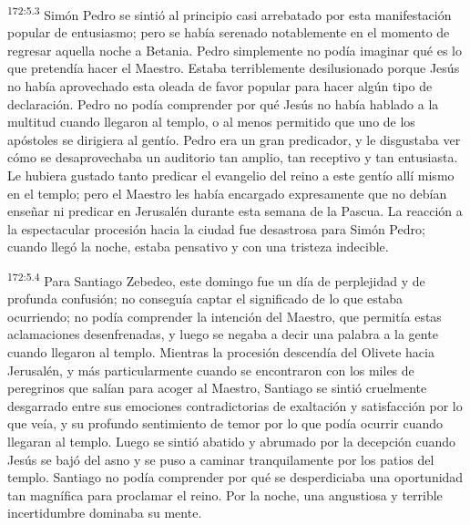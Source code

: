 \par 
\textsuperscript{172:5.3} Simón Pedro se sintió al principio casi arrebatado por esta manifestación popular de entusiasmo; pero se había serenado notablemente en el momento de regresar aquella noche a Betania. Pedro simplemente no podía imaginar qué es lo que pretendía hacer el Maestro. Estaba terriblemente desilusionado porque Jesús no había aprovechado esta oleada de favor popular para hacer algún tipo de declaración. Pedro no podía comprender por qué Jesús no había hablado a la multitud cuando llegaron al templo, o al menos permitido que uno de los apóstoles se dirigiera al gentío. Pedro era un gran predicador, y le disgustaba ver cómo se desaprovechaba un auditorio tan amplio, tan receptivo y tan entusiasta. Le hubiera gustado tanto predicar el evangelio del reino a este gentío allí mismo en el templo; pero el Maestro les había encargado expresamente que no debían enseñar ni predicar en Jerusalén durante esta semana de la Pascua. La reacción a la espectacular procesión hacia la ciudad fue desastrosa para Simón Pedro; cuando llegó la noche, estaba pensativo y con una tristeza indecible.

\par 
\textsuperscript{172:5.4} Para Santiago Zebedeo, este domingo fue un día de perplejidad y de profunda confusión; no conseguía captar el significado de lo que estaba ocurriendo; no podía comprender la intención del Maestro, que permitía estas aclamaciones desenfrenadas, y luego se negaba a decir una palabra a la gente cuando llegaron al templo. Mientras la procesión descendía del Olivete hacia Jerusalén, y más particularmente cuando se encontraron con los miles de peregrinos que salían para acoger al Maestro, Santiago se sintió cruelmente desgarrado entre sus emociones contradictorias de exaltación y satisfacción por lo que veía, y su profundo sentimiento de temor por lo que podía ocurrir cuando llegaran al templo. Luego se sintió abatido y abrumado por la decepción cuando Jesús se bajó del asno y se puso a caminar tranquilamente por los patios del templo. Santiago no podía comprender por qué se desperdiciaba una oportunidad tan magnífica para proclamar el reino. Por la noche, una angustiosa y terrible incertidumbre dominaba su mente.

